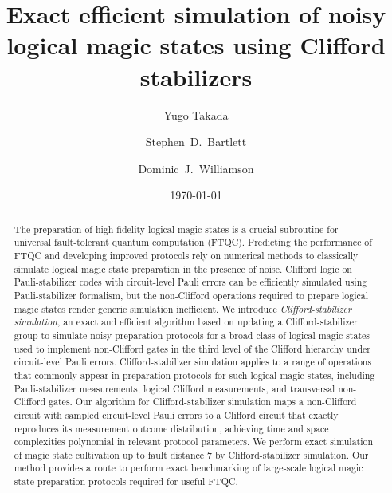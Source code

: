 \documentclass[
 reprint,
 amsmath,amssymb,
 pra,superscriptaddress, nofootinbib
]{revtex4-2}
\theoremstyle{definition}
\theoremstyle{plain}
\begin{document}
\title{Exact efficient simulation of noisy logical magic states using Clifford stabilizers}

\author{Yugo Takada}
%
\author{Stephen~D.~Bartlett}
%
\author{Dominic~J.~Williamson}
%

\date{\today}

\begin{abstract}
The preparation of high-fidelity logical magic states is a crucial subroutine for universal fault-tolerant quantum computation (FTQC). 
Predicting the performance of FTQC and developing improved protocols rely on numerical methods to classically simulate logical magic state preparation in the presence of noise.  
Clifford logic on Pauli-stabilizer codes with circuit-level Pauli errors can be efficiently simulated using Pauli-stabilizer formalism, but the non-Clifford operations required to prepare logical magic states render generic simulation inefficient. 
We introduce \emph{Clifford-stabilizer simulation}, an exact and efficient algorithm based on updating a Clifford-stabilizer group to simulate noisy preparation protocols for a broad class of logical magic states used to implement non-Clifford gates in the third level of the Clifford hierarchy under circuit-level Pauli errors. 
Clifford-stabilizer simulation applies to a range of operations that commonly appear in preparation protocols for such logical magic states, including Pauli-stabilizer measurements, logical Clifford measurements, and transversal non-Clifford gates.
Our algorithm for Clifford-stabilizer simulation maps a non-Clifford circuit with sampled circuit-level Pauli errors to a Clifford circuit that exactly reproduces its measurement outcome distribution, achieving time and space complexities polynomial in relevant protocol parameters.
We perform exact simulation of magic state cultivation up to fault distance 7 by Clifford-stabilizer simulation. 
Our method provides a route to perform exact benchmarking of large-scale logical magic state preparation protocols required for useful FTQC.
\end{abstract}

\maketitle
\makeatletter
\renewcommand{\l@subsection}[2]{}
\renewcommand{\l@subsubsection}[2]{}
\makeatother
\tableofcontents
\end{document}

